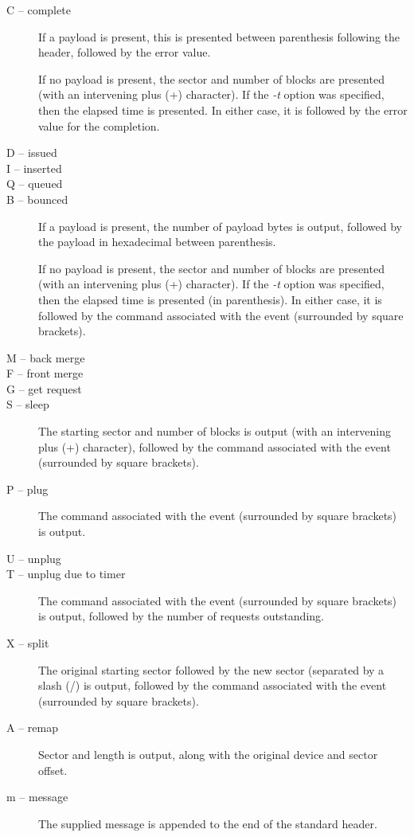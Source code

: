 \documentclass{article}
\begin{document}
\begin{description}
  \item[C -- complete] If a payload is present, this is presented between
  parenthesis following the header, followed by the error value. 

  If no payload is present, the sector and number of blocks are presented
  (with an intervening plus (+) character). If the \emph{-t} option
  was specified, then the elapsed time is presented. In either case,
  it is followed by the error value for the completion.

  \item[D -- issued]
  \item[I -- inserted]
  \item[Q -- queued]
  \item[B -- bounced] If a payload is present, the number of payload bytes
  is output, followed by the payload in hexadecimal between parenthesis.

  If no payload is present, the sector and number of blocks are presented
  (with an intervening plus (+) character). If the \emph{-t} option was
  specified, then the elapsed time is presented (in parenthesis). In
  either case, it is followed by the command associated with the event
  (surrounded by square brackets).

  \item[M -- back merge]
  \item[F -- front merge]
  \item[G -- get request]
  \item[S -- sleep] The starting sector and number of blocks is output
  (with an intervening plus (+) character), followed by the command
  associated with the event (surrounded by square brackets).

  \item[P -- plug] The command associated with the event (surrounded by
  square brackets) is output.

  \item[U -- unplug]
  \item[T -- unplug due to timer] The command associated with the event
  (surrounded by square brackets) is output, followed by the number of
  requests outstanding.

  \item[X -- split] The original starting sector followed by the new
  sector (separated by a slash (/) is output, followed by the command
  associated with the event (surrounded by square brackets).

  \item[A -- remap] Sector and length is output, along with the original
  device and sector offset.

  \item[m -- message] The supplied message is appended to the end of
  the standard header.

\end{description}
\end{document}
